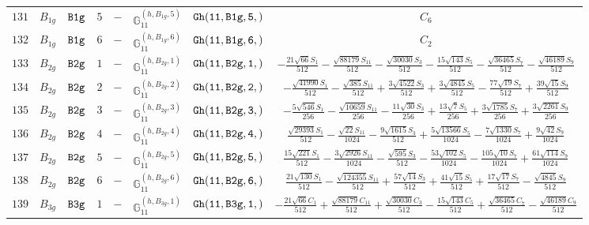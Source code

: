 \documentclass[fleqn,8pt]{jsarticle}
\begin{document}
\begin{table}[ht!]
\begin{center}
\begin{tabular}{cccccccc}
$ 131 $ & $ B_{1g} $ & $ {\tt B1g} $ & $ 5 $ & $ - $ & $ \mathbb{G}_{11}^{(h,B_{1g},5)} $ & $ {\tt Gh(11,B1g,5,)} $ & $ C_{6} $ \\
$ 132 $ & $ B_{1g} $ & $ {\tt B1g} $ & $ 6 $ & $ - $ & $ \mathbb{G}_{11}^{(h,B_{1g},6)} $ & $ {\tt Gh(11,B1g,6,)} $ & $ C_{2} $ \\
$ 133 $ & $ B_{2g} $ & $ {\tt B2g} $ & $ 1 $ & $ - $ & $ \mathbb{G}_{11}^{(h,B_{2g},1)} $ & $ {\tt Gh(11,B2g,1,)} $ & $ - \frac{21 \sqrt{66} S_{1}}{512} - \frac{\sqrt{88179} S_{11}}{512} - \frac{\sqrt{30030} S_{3}}{512} - \frac{15 \sqrt{143} S_{5}}{512} - \frac{\sqrt{36465} S_{7}}{512} - \frac{\sqrt{46189} S_{9}}{512} $ \\
$ 134 $ & $ B_{2g} $ & $ {\tt B2g} $ & $ 2 $ & $ - $ & $ \mathbb{G}_{11}^{(h,B_{2g},2)} $ & $ {\tt Gh(11,B2g,2,)} $ & $ - \frac{\sqrt{41990} S_{1}}{512} - \frac{\sqrt{385} S_{11}}{512} + \frac{3 \sqrt{4522} S_{3}}{512} + \frac{3 \sqrt{4845} S_{5}}{512} - \frac{77 \sqrt{19} S_{7}}{512} + \frac{39 \sqrt{15} S_{9}}{512} $ \\
$ 135 $ & $ B_{2g} $ & $ {\tt B2g} $ & $ 3 $ & $ - $ & $ \mathbb{G}_{11}^{(h,B_{2g},3)} $ & $ {\tt Gh(11,B2g,3,)} $ & $ - \frac{5 \sqrt{546} S_{1}}{256} - \frac{\sqrt{10659} S_{11}}{256} - \frac{11 \sqrt{30} S_{3}}{256} + \frac{13 \sqrt{7} S_{5}}{256} + \frac{3 \sqrt{1785} S_{7}}{256} + \frac{3 \sqrt{2261} S_{9}}{256} $ \\
$ 136 $ & $ B_{2g} $ & $ {\tt B2g} $ & $ 4 $ & $ - $ & $ \mathbb{G}_{11}^{(h,B_{2g},4)} $ & $ {\tt Gh(11,B2g,4,)} $ & $ \frac{\sqrt{29393} S_{1}}{512} - \frac{\sqrt{22} S_{11}}{1024} - \frac{9 \sqrt{1615} S_{3}}{512} + \frac{5 \sqrt{13566} S_{5}}{1024} - \frac{7 \sqrt{1330} S_{7}}{1024} + \frac{9 \sqrt{42} S_{9}}{1024} $ \\
$ 137 $ & $ B_{2g} $ & $ {\tt B2g} $ & $ 5 $ & $ - $ & $ \mathbb{G}_{11}^{(h,B_{2g},5)} $ & $ {\tt Gh(11,B2g,5,)} $ & $ \frac{15 \sqrt{221} S_{1}}{512} - \frac{3 \sqrt{2926} S_{11}}{1024} - \frac{\sqrt{595} S_{3}}{512} - \frac{53 \sqrt{102} S_{5}}{1024} - \frac{105 \sqrt{10} S_{7}}{1024} + \frac{61 \sqrt{114} S_{9}}{1024} $ \\
$ 138 $ & $ B_{2g} $ & $ {\tt B2g} $ & $ 6 $ & $ - $ & $ \mathbb{G}_{11}^{(h,B_{2g},6)} $ & $ {\tt Gh(11,B2g,6,)} $ & $ \frac{21 \sqrt{130} S_{1}}{512} - \frac{\sqrt{124355} S_{11}}{512} + \frac{57 \sqrt{14} S_{3}}{512} + \frac{41 \sqrt{15} S_{5}}{512} + \frac{17 \sqrt{17} S_{7}}{512} - \frac{\sqrt{4845} S_{9}}{512} $ \\
$ 139 $ & $ B_{3g} $ & $ {\tt B3g} $ & $ 1 $ & $ - $ & $ \mathbb{G}_{11}^{(h,B_{3g},1)} $ & $ {\tt Gh(11,B3g,1,)} $ & $ - \frac{21 \sqrt{66} C_{1}}{512} + \frac{\sqrt{88179} C_{11}}{512} + \frac{\sqrt{30030} C_{3}}{512} - \frac{15 \sqrt{143} C_{5}}{512} + \frac{\sqrt{36465} C_{7}}{512} - \frac{\sqrt{46189} C_{9}}{512} $ \\

\end{tabular}
\end{center}
\end{table}
\end{document}
